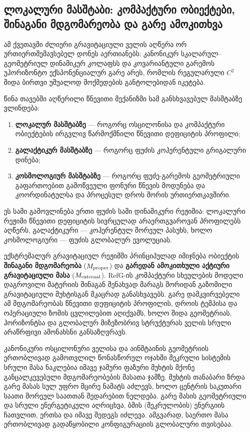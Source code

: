 \documentclass[11pt,a4paper]{article}
\begin{document}
\subsection{ლოკალური მასშტაბი: კომპაქტური ობიექტები, შინაგანი მდგომარეობა და გარე ამოკითხვა}

ამ ქვეთავში ძლიერი გრავიტაციული ველის აღწერა ორ ურთიერთშემავსებელ დონეს აერთიანებს: კანონიკურ სკალარულ–გეომეტრიულ დინამიკურ კოლაფსს და კოვარიანტული გარემოს უჰორიზონტო ექსპონენციალურ გარე არეს, რომლის რეგულარული $C^2$ შიდა ბირთვი უშუალოდ მოქმედების განტოლებიდან იკეტება.

წინა თავებში აღწერილი წნევითი მექანიზმი სამ განსხვავებულ მასშტაბზე ვლინდება:

\begin{enumerate}[label=\arabic*.]
\item \textbf{ლოკალურ მასშტაბზე} — როგორც ოსცილონისა და კომპაქტური ობიექტების ირგვლივ წარმოქმნილი წნევითი დეფიციტის პროფილი;
\item \textbf{გალაქტიკურ მასშტაბზე} — როგორც ფუძის კოჰერენტული გრიგალური დინება;
\item \textbf{კოსმოლოგიურ მასშტაბზე} — როგორც ფუძე-გარემოს გეომეტრიული გაფართოებით გამოწვეული ფონური წნევის მოდუნება და კოორდინატულსა და პროცესულ დროს შორის ურთიერთკავშირი.

\end{enumerate}
ეს სამი გამოვლინება ერთი ფუძის სამი დინამიკური რეჟიმია: ლოკალური რეჟიმი წნევითი დეფიციტის სივრცულად არაერთგვაროვან პროფილებს აღწერს, გალაქტიკური — კოჰერენტულ შორეულ პასუხს, ხოლო კოსმოლოგიური — ფუძის გლობალურ ევოლუციას.

ექსტრემალურ გრავიტაციულ რეჟიმში პრინციპულად იმიჯნება ობიექტის \textbf{შინაგანი მდგომარეობა} ($M_{\rm proper}$) და \textbf{გარედან ამოკითხული აქტიური გრავიტაციული მასა} ($M_{\rm external}$). RefG-ის კომპაქტური სხეულების მოდელი დაგროვილი მატერიის შინაგან შენახვად მარაგს შორიდან გაზომილი გრავიტაციული მუხტისგან მკაცრად განასხვავებს. გარე დამკვირვებელი ამ მდგომარეობას წნევითი დეფიციტის პროფილის, დროის ტემპისა და ოპერაციული ზომის ცვლილებით აღიქვამს, ხოლო შიდა გეომეტრიას, ჰორიზონტსა და გლობალურ მიზეზობრივ სტრუქტურას ველის სრული არაწრფივი ამონახსნი განსაზღვრავს.

კანონიკური ოსცილონური ველისა და აინშტაინის გეომეტრიის ერთობლივად გამოთვლილ წონასწორულ ოჯახში შეკრული სისტემის სრული მასა ნაკლებია იმავე ჯამური ფაზური მუხტის მქონე განცალკევებული მდგომარეობების მასათა ჯამზე. მუხტის თანაბარი ზრდა გარე მასას სულ უფრო მცირე ნამატს აძლევს, ხოლო ცენტრის საკუთარი საათი შორეულ საათთან შედარებით ნელდება. გარე მასის გეომეტრიული და სრული ენერგეტიკული აღრიცხვა, ბმის (შეკრულობის) ენერგიის ჩათვლით, ერთსა და იმავე შედეგს იძლევა. ამგვარად, საერთო მასა ერთობლივად გადაწყობილი კონფიგურაციის გლობალური თვისებაა.
\end{document}

